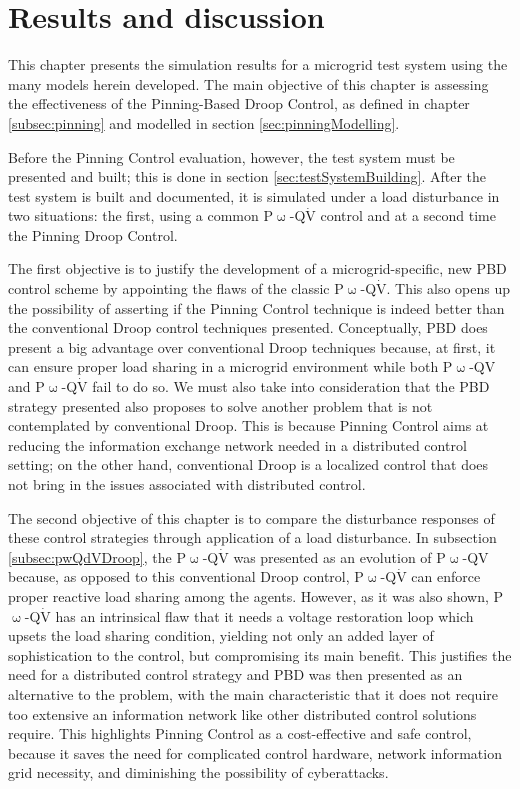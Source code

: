 \chapter{Results and discussion}\label{chapter:results}

	This chapter presents the simulation results for a microgrid test system using the many models herein developed. The main objective of this chapter is assessing the effectiveness of the Pinning-Based Droop Control, as defined in chapter \ref{subsec:pinning} and modelled in section \ref{sec:pinningModelling}.

	Before the Pinning Control evaluation, however, the test system must be presented and built; this is done in section \ref{sec:testSystemBuilding}. After the test system is built and documented, it is simulated under a load disturbance in two situations: the first, using a common P$\upomega$-Q$\dot{\text{V}}$ control and at a second time the Pinning Droop Control.

	The first objective is to justify the development of a microgrid-specific, new PBD control scheme by appointing the flaws of the classic P$\upomega$-Q$\dot{\text{V}}$. This also opens up the possibility of asserting if the Pinning Control technique is indeed better than the conventional Droop control techniques presented. Conceptually, PBD does present a big advantage over conventional Droop techniques because, at first, it can ensure proper load sharing in a microgrid environment while both P$\upomega$-QV and P$\upomega$-Q$\dot{\text{V}}$ fail to do so. We must also take into consideration that the PBD strategy presented also proposes to solve another problem that is not contemplated by conventional Droop. This is because Pinning Control aims at reducing the information exchange network needed in a distributed control setting; on the other hand, conventional Droop is a localized control that does not bring in the issues associated with distributed control.

	The second objective of this chapter is to compare the disturbance responses of these control strategies through application of a load disturbance. In subsection \ref{subsec:pwQdVDroop}, the P$\upomega$-Q$\dot{\text{V}}$ was presented as an evolution of P$\upomega$-QV because, as opposed to this conventional Droop control, P$\upomega$-Q$\dot{\text{V}}$ can enforce proper reactive load sharing among the agents. However, as it was also shown, P$\upomega$-Q$\dot{\text{V}}$ has an intrinsical flaw that it needs a voltage restoration loop which upsets the load sharing condition, yielding not only an added layer of sophistication to the control, but compromising its main benefit. This justifies the need for a distributed control strategy and PBD was then presented as an alternative to the problem, with the main characteristic that it does not require too extensive an information network like other distributed control solutions require. This highlights Pinning Control as a cost-effective and safe control, because it saves the need for complicated control hardware, network information grid necessity, and diminishing the possibility of cyberattacks.

